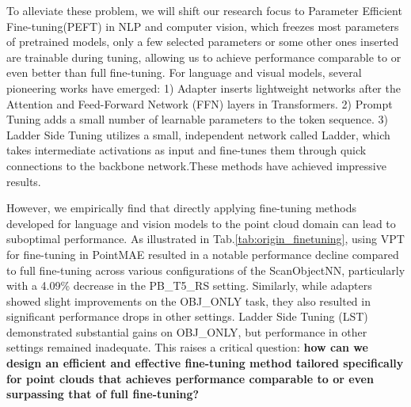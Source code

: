 To alleviate these problem, we will shift our research focus to Parameter Efficient Fine-tuning(PEFT)\cite{houlsby2019parameter,jie2023fact,karimi2021compacter,jia2022visual,lian2022scaling,sung2022lst,hu2021lora,zaken2022bitfit,li2021prefix,chen2022adaptformer,lester-etal-2021-power} in NLP and computer vision, which freezes most parameters of pretrained models, only a few selected parameters or some other ones inserted are trainable during tuning, allowing us to achieve performance comparable to or even better than full fine-tuning. For language and visual models, several pioneering works have emerged: 1) Adapter\cite{houlsby2019parameter,chen2022adaptformer} inserts lightweight networks after the Attention and Feed-Forward Network (FFN) layers in Transformers. 2) Prompt Tuning\cite{li2021prefix,lester-etal-2021-power,jia2022visual} adds a small number of learnable parameters to the token sequence. 3) Ladder Side Tuning\cite{sung2022lst} utilizes a small, independent network called Ladder, which takes intermediate activations as input and fine-tunes them through quick connections to the backbone network.These methods have achieved impressive results.

However, we empirically find that directly applying fine-tuning methods developed for language and vision models to the point cloud domain can lead to suboptimal performance. As illustrated in Tab.\ref{tab:origin_finetuning}, using VPT\cite{jia2022visual} for fine-tuning in PointMAE\cite{pang2022masked} resulted in a notable performance decline compared to full fine-tuning across various configurations of the ScanObjectNN\cite{uy2019revisiting}, particularly with a 4.09\% decrease in the PB\_T5\_RS setting. Similarly, while adapters\cite{houlsby2019parameter} showed slight improvements on the OBJ\_ONLY task, they also resulted in significant performance drops in other settings. Ladder Side Tuning (LST)\cite{sung2022lst} demonstrated substantial gains on OBJ\_ONLY, but performance in other settings remained inadequate. This raises a critical question: \textbf{how can we design an efficient and effective fine-tuning method tailored specifically for point clouds that achieves performance comparable to or even surpassing that of full fine-tuning?}

